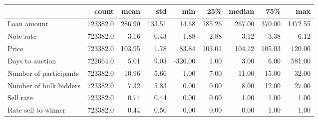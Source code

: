 \begin{tabular}{lrrrrrrrr}
\toprule
{} &     count &    mean &     std &     min &     25\% &  median &     75\% &      max \\
\midrule
Loan amount            &  723382.0 &  286.90 &  133.51 &   14.68 &  185.26 &  267.00 &  370.00 &  1472.55 \\
Note rate              &  723382.0 &    3.16 &    0.43 &    1.88 &    2.88 &    3.12 &    3.38 &     6.12 \\
Price                  &  723382.0 &  103.95 &    1.78 &   83.84 &  103.01 &  104.12 &  105.03 &   120.00 \\
Days to auction        &  722664.0 &    5.01 &    9.03 & -326.00 &    1.00 &    3.00 &    6.00 &   581.00 \\
Number of participants &  723382.0 &   10.96 &    5.66 &    1.00 &    7.00 &   11.00 &   15.00 &    32.00 \\
Number of bulk bidders &  723382.0 &    7.32 &    5.83 &    0.00 &    0.00 &    8.00 &   12.00 &    27.00 \\
Sell rate              &  723382.0 &    0.74 &    0.44 &    0.00 &    0.00 &    1.00 &    1.00 &     1.00 \\
Rate sell to winner    &  723382.0 &    0.44 &    0.50 &    0.00 &    0.00 &    0.00 &    1.00 &     1.00 \\
\bottomrule
\end{tabular}
